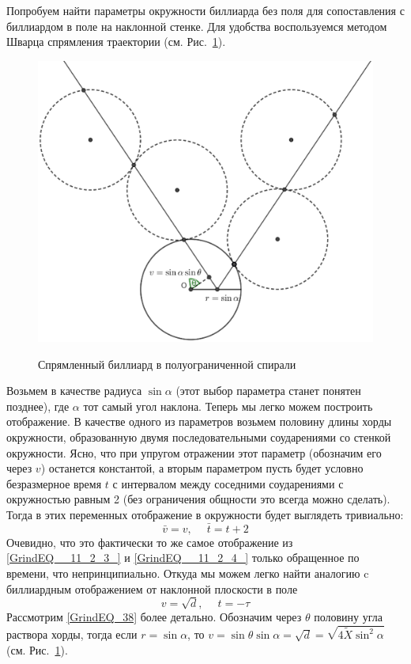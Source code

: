 \documentclass[a4paper]{article}
\begin{document}
 Попробуем найти  параметры окружности биллиарда без поля для сопоставления с биллиардом в поле на наклонной стенке. Для удобства воспользуемся методом Шварца спрямления траектории (см. Рис.~\ref{circle5_image}).
 \begin{figure}[ht]
  \centering
  \includegraphics[width=.5\linewidth]{circle5_image.eps}\\
  \caption{Спрямленный биллиард в полуограниченной спирали }\label{circle5_image}
\end{figure}
 Возьмем в качестве радиуса $\sin \alpha$ (этот выбор параметра  станет понятен позднее), где $\alpha$ тот самый угол наклона. Теперь мы легко можем построить отображение. В качестве одного из параметров возьмем половину длины хорды окружности, образованную двумя последовательными соударениями со стенкой окружности. Ясно, что при упругом отражении этот параметр (обозначим его через $v$) останется константой, а вторым параметром пусть будет условно безразмерное время $t$ с интервалом между соседними соударениями с окружностью равным 2 (без ограничения общности это всегда можно сделать). Тогда в этих переменных отображение в окружности будет выглядеть тривиально:
\begin{equation} \label{GrindEQ_38} \bar{v}=v,\;\quad \bar{t}=t+2 \end{equation}
Очевидно, что это фактически  то же самое отображение из \eqref{GrindEQ__11_2_3_} и  \eqref{GrindEQ__11_2_4_} только обращенное по времени, что непринципиально. Откуда мы можем легко найти аналогию c биллиардным отображением от наклонной плоскости в поле 
\begin{equation} \label{GrindEQ_39} v = \sqrt{d},\;\quad t=-\tau \end{equation}
Рассмотрим \eqref{GrindEQ_38} более детально. Обозначим через $\theta$ половину угла раствора хорды, тогда если $r=\sin\alpha$, то $v=\sin\theta\sin\alpha=\sqrt{d} = \sqrt{4 \tilde{X}\sin^2\alpha}$ (см. Рис.~\ref{circle5_image}). 
\end{document}
